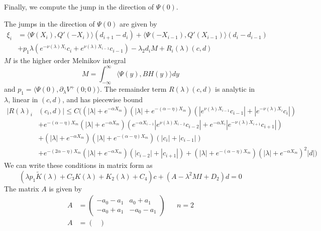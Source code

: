 \documentclass[thesis.tex]{subfiles}
\begin{document}
Finally, we compute the jump in the direction of $\Psi(0)$.
\begin{lemma}\label{jumpadj}
The jumps in the direction of $\Psi(0)$ are given by
\begin{equation}\label{jumpPsi0}
\begin{aligned}
\xi_i &= \langle \Psi(X_i), Q'(-X_i) \rangle (d_{i+1} - d_i ) + \langle \Psi(-X_{i-1}), Q'(X_{i-1}) \rangle (d_i - d_{i-1} ) \\
&+ p_1 \lambda( e^{-\nu(\lambda)X_i}c_i + e^{\nu(\lambda)X_{i-1}}c_{i-1})
- \lambda_2 d_i M + R_i(\lambda)(c, d)
\end{aligned}
\end{equation}
$M$ is the higher order Melnikov integral
\begin{equation}\label{M}
M = \int_{-\infty}^\infty \langle \Psi(y), B H(y) \rangle dy
\end{equation}
and $p_1 = \langle \Psi(0), \partial_\lambda V^+(0; 0) \rangle$. The remainder term $R(\lambda)(c, d)$ is analytic in $\lambda$, linear in $(c, d)$, and has piecewise bound
\begin{align*}
|R(\lambda)_i&(c_i, d)| \leq C \Big( (|\lambda| + e^{-\alpha X_m})(|\lambda| + e^{-(\alpha - \eta) X_m})(|e^{\nu(\lambda)X_{i-1}}c_{i-1}| + |e^{-\nu(\lambda)X_i}c_i|) \\
&+ e^{-(\alpha - \eta)X_m} (|\lambda| + e^{-\alpha X_m})(e^{-\alpha X_{i-1}} |e^{\nu(\lambda)X_{i-2}}c_{i-2}| + e^{-\alpha X_i} |e^{-\nu(\lambda)X_{i+1}}c_{i+1}|) \\
&+ (|\lambda| + e^{-\alpha X_m})(|\lambda| + e^{-(\alpha - \eta) X_m})(|c_i| + |c_{i-1}|) \\
&+ e^{-(2 \alpha - \eta)X_m} (|\lambda| + e^{-\alpha X_m})(|c_{i-2}| + |c_{i+1}|) 
+ (|\lambda| + e^{-(\alpha - \eta) X_m})(|\lambda| + e^{-\alpha X_m})^2 |d| \Big)
\end{align*}
We can write these conditions in matrix form as
\begin{equation}
(\lambda p_1 \tilde{K}(\lambda) + C_3 K(\lambda) + K_2(\lambda) + C_4 )c + (A - \lambda^2 M I + D_2)d = 0
\end{equation}
The matrix $A$ is given by
\begin{align*}
A &= \begin{pmatrix}
-a_0 -a_1 & a_0 + a_1 \\
-a_0 + a_1 & -a_0 - a_1
\end{pmatrix} && n = 2 \\
A &= \begin{pmatrix}

\end{pmatrix}
\end{align*}
\end{lemma}
\end{document}

